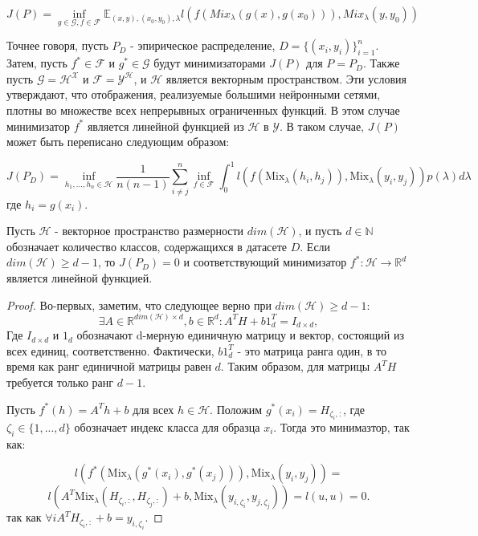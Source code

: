 \begin{equation}
J(P) = \inf_{g\in \mathcal{G}, f\in \mathcal{F}} \mathbb{E}_{(x,y),(x_0, y_0), \lambda} l( f(Mix_\lambda(g(x), g(x_0))), Mix_\lambda(y, y_0))
\end{equation}

Точнее говоря, пусть $P_D$ - эпирическое распределение, $D = \{(x_i, y_i)\}_{i=1}^{n}$. Затем, пусть $f^* \in \mathcal{F}$ и $g^* \in \mathcal{G}$ будут минимизаторами $J(P)$ для $P = P_D$. Также пусть $\mathcal{G} = \mathcal{H}^\mathcal{X}$ и $\mathcal{F} = \mathcal{Y}^\mathcal{H}$, и $\mathcal{H}$ является векторным пространством. Эти условия утверждают, что отображения, реализуемые большими нейронными сетями, плотны во множестве всех непрерывных ограниченных функций. В этом случае минимизатор $f^*$ является линейной функцией из $\mathcal{H}$ в $\mathcal{Y}$. В таком случае, $J(P)$ может быть переписано следующим образом:

\begin{equation}
J(P_D) = \inf_{h_1,...,h_n \in \mathcal{H}} \frac{1}{n(n-1)} \sum_{i \neq j}^n \inf_{f \in \mathcal{F}} \int_{0
}^{1} l( f(\text{Mix}_{\lambda}(h_i, h_j)), \text{Mix}_{\lambda}(y_i, y_j)) p(\lambda) d\lambda
\end{equation}
где $h_i = g(x_i)$.

\begin{theorem}
Пусть $\mathcal{H}$ - векторное пространство размерности $dim(\mathcal{H})$, и пусть $d \in \mathbb{N}$ обозначает количество классов, содержащихся в датасете $D$. Если $dim (\mathcal{H}) \geq d-1$, то $J(P_D) = 0$ и соответствующий минимизатор $f^*: \mathcal{H} \rightarrow \mathbb{R}^d$ является линейной функцией.
\end{theorem}
\begin{proof}
Во-первых, заметим, что следующее верно при $dim(\mathcal{H}) \geq d - 1$:
$$ \exists A \in \mathbb{R}^{dim(\mathcal{H}) \times d}, b \in \mathbb{R}^{d} : A^{T}H + b 1_{d}^{T} = I_{d\times d}, $$
Где $I_{d \times d}$ и $1_d$ обозначают d-мерную единичную матрицу и вектор, состоящий из всех единиц, соответственно. Фактически, $b 1_{d}^{T}$ - это матрица ранга один, в то время как ранг единичной матрицы равен $d$. Таким образом, для матрицы $A^{T}H$ требуется только ранг $d - 1$.

Пусть $f^{*}(h) = A^T h + b$ для всех $h \in \mathcal{H}$. Положим $g^{*}(x_i) = H_{\zeta_i,:}$, где $\zeta_i \in \{1, . . . , d\}$ обозначает индекс класса для образца $x_i$. Тогда это минимазтор, так как:

$$l(f^{*}(\text{Mix}_{\lambda}(g^{*} (x_i), g^{*} (x_j))), \text{Mix}_{\lambda}(y_i, y_j)) =$$
$$l(A^T \text{Mix}_{\lambda}(H_{\zeta_i,:}, H_{\zeta_j,:}) + b, \text{Mix}_{\lambda}(y_{i,\zeta_i}, y_{j,\zeta_j})) = l(u, u) = 0. $$
так как $\forall i A^T H_{\zeta_i, :} + b = y_{i,\zeta_i}$.
\end{proof}

